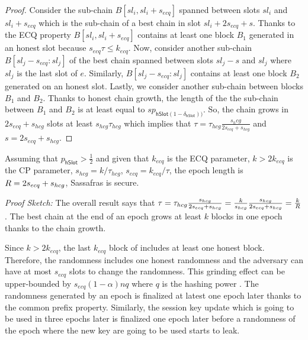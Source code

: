 \begin{proof}
	Consider the sub-chain $ B[sl_i,sl_i+s_{ecq}] $ spanned between slots $ sl_i $ and $ sl_i + s_{ecq} $  which is the sub-chain of a best chain in slot $ sl_i +  2s_{ecq} + s  $. Thanks to the ECQ property $ B[sl_i,sl_i+s_{ecq}] $ contains at least one block $ B_1 $ generated in an honest slot because  $ s_{ecq} \tau\leq k_{ecq} $.   Now, consider another sub-chain $ B[sl_j -s_{ecq} :sl_j] $ of the best chain spanned between slots $ sl_j - s $ and $ sl_j $ where $ sl_j $  is the last slot of $ e $. Similarly, $ B[sl_j -s_{ecq} :sl_j] $ contains at least one block $ B_2 $ generated on an honest slot. Lastly, we consider another sub-chain between blocks $ B_1 $ and $ B_2 $.  Thanks to honest chain growth, the length of the the sub-chain between $ B_1 $ and $ B_2 $ is at least equal to $ s p_{\mathsf{hSlot}(1-\delta_{\mathsf{hSlot}}))} $. So, the chain grows in $ 2s_{ecq} + s_{hcg} $ slots at least $ s_{hcg}\tau_{hcg} $ which implies that $ \tau = \tau_{hcg} \frac{s_hcg}{2 s_{ecq} + s_{hcg}} $ \cite{genesis} and $ s = 2s_{ecq} + s_{hcg} $. 
\end{proof}



\begin{theorem}\label{th:sec}
	Assuming that  $ p_{\mathsf{hSlot}} >\frac{1}{2}$ and given that  $k_{ecq}$ is the ECQ parameter, $k > 2k_{ecq}$ is the CP parameter, $s_{hcg} = k/\tau_{hcg}$, $s_{ecq} = k_{ecq}/\tau$, the epoch length is $R  = 2s_{ecq} + s_{hcg}$, Sassafras is secure.
\end{theorem}

\emph{Proof Sketch:}
The overall result says that $\tau = \tau_{hcg}\frac{s_{hcg}}{2s_{ecq}+s_{hcg}} = \frac{k}{s_{hcg}}\frac{s_{hcg}}{2s_{ecq}+s_{hcg}} = \frac{k}{R }$. The best chain at the end of an epoch grows at least $k$ blocks in one epoch thanks to the chain growth.

Since $k > 2k_{ecq}$, the last $k_{ecq}$ block of includes at least one honest block. Therefore, the randomness includes one honest randomness and the adversary can have at most $s_{ecq}$ slots to change the randomness. This grinding effect can be upper-bounded by $s_{ecq}(1-\alpha)nq$ where $q$ is the hashing power \cite{ouroboros}. The randomness generated by an epoch is finalized at latest one epoch later thanks to the common prefix property. Similarly, the session key update which is going to be used in three epochs later is finalized one epoch later before a randomness of the epoch where the new key are going to be used starts to leak.

